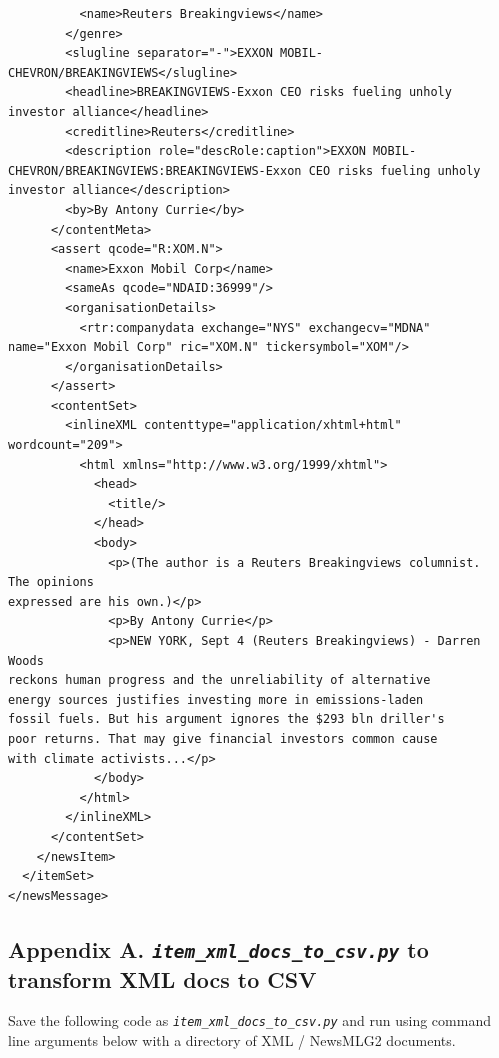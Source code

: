 \documentclass[11pt]{article}
\begin{document}
\begin{lstlisting}
          <name>Reuters Breakingviews</name>
        </genre>
        <slugline separator="-">EXXON MOBIL-CHEVRON/BREAKINGVIEWS</slugline>
        <headline>BREAKINGVIEWS-Exxon CEO risks fueling unholy investor alliance</headline>
        <creditline>Reuters</creditline>
        <description role="descRole:caption">EXXON MOBIL-CHEVRON/BREAKINGVIEWS:BREAKINGVIEWS-Exxon CEO risks fueling unholy investor alliance</description>
        <by>By Antony Currie</by>
      </contentMeta>
      <assert qcode="R:XOM.N">
        <name>Exxon Mobil Corp</name>
        <sameAs qcode="NDAID:36999"/>
        <organisationDetails>
          <rtr:companydata exchange="NYS" exchangecv="MDNA" name="Exxon Mobil Corp" ric="XOM.N" tickersymbol="XOM"/>
        </organisationDetails>
      </assert>
      <contentSet>
        <inlineXML contenttype="application/xhtml+html" wordcount="209">
          <html xmlns="http://www.w3.org/1999/xhtml">
            <head>
              <title/>
            </head>
            <body>
              <p>(The author is a Reuters Breakingviews columnist.  The opinions
expressed are his own.)</p>
              <p>By Antony Currie</p>
              <p>NEW YORK, Sept 4 (Reuters Breakingviews) - Darren Woods
reckons human progress and the unreliability of alternative
energy sources justifies investing more in emissions-laden
fossil fuels. But his argument ignores the $293 bln driller's
poor returns. That may give financial investors common cause
with climate activists...</p>
            </body>
          </html>
        </inlineXML>
      </contentSet>
    </newsItem>
  </itemSet>
</newsMessage>
\end{lstlisting}
\newpage

\subsection{Appendix A. \textit{\lstinline{item_xml_docs_to_csv.py}} to transform XML docs to CSV}
\label{sec:AppendixA}
Save the following code as \textit{\lstinline{item_xml_docs_to_csv.py}} and run using command line arguments below with a directory of XML / NewsMLG2 documents.
\\
\end{document}
